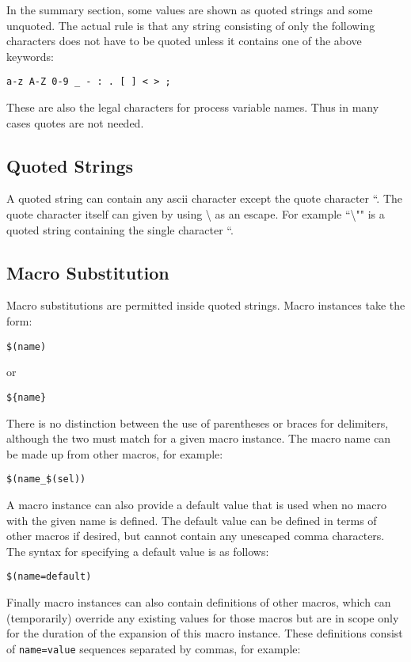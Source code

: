In the summary section, some values are shown as quoted strings and some unquoted. The actual rule is that any string 
consisting of only the following characters does not have to be quoted unless it contains one of the above keywords:

\begin{verbatim}a-z A-Z 0-9 _ - : . [ ] < > ;
\end{verbatim}These are also the legal characters for process variable names. Thus in many cases quotes are not needed.

\subsection{Quoted Strings}

A quoted string can contain any ascii character except the quote character ``. The quote character itself can given by using 
\textbackslash{} as an escape. For example ``\textbackslash{}"" is a quoted string containing the single character ``.

\subsection{Macro Substitution}

Macro substitutions are permitted inside quoted strings. Macro instances take the form:

\begin{verbatim}$(name)
\end{verbatim}or

\begin{verbatim}${name}
\end{verbatim}There is no distinction between the use of parentheses or braces for delimiters, although the two must match for a given 
macro instance. The macro name can be made up from other macros, for example:

\begin{verbatim}$(name_$(sel))
\end{verbatim}A macro instance can also provide a default value that is used when no macro with the given name is defined. The default 
value can be defined in terms of other macros if desired, but cannot contain any unescaped comma characters. The syntax 
for specifying a default value is as follows:

\begin{verbatim}$(name=default)
\end{verbatim}Finally macro instances can also contain definitions of other macros, which can (temporarily) override any existing values 
for those macros but are in scope only for the duration of the expansion of this macro instance. These definitions consist 
of \verb|name=value| sequences separated by commas, for example:

